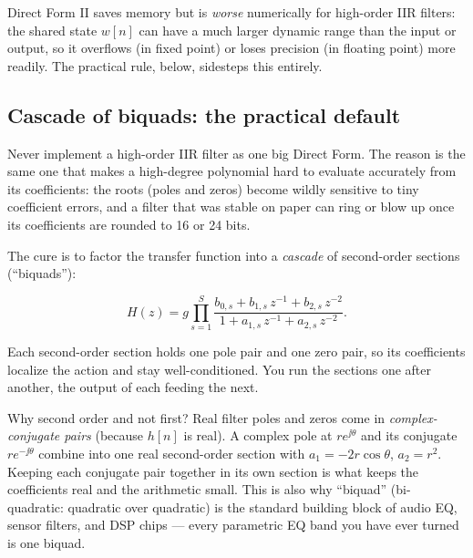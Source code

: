 \begin{trapbox}
Direct Form II saves memory but is \emph{worse} numerically for high-order IIR
filters: the shared state $w[n]$ can have a much larger dynamic range than the
input or output, so it overflows (in fixed point) or loses precision (in
floating point) more readily. The practical rule, below, sidesteps this entirely.
\end{trapbox}

\subsection{Cascade of biquads: the practical default}
\label{ch17:biquad}

Never implement a high-order IIR filter as one big Direct Form. The reason is
the same one that makes a high-degree polynomial hard to evaluate accurately from its
coefficients: the roots (poles and zeros) become wildly sensitive to tiny
coefficient errors, and a filter that was stable on paper can ring or blow up
once its coefficients are rounded to 16 or 24 bits.

The cure is to factor the transfer function into a \emph{cascade} of
second-order sections (``biquads''):

\begin{equation}
  H(z) = g \prod_{s=1}^{S} \frac{b_{0,s} + b_{1,s}\,z^{-1} + b_{2,s}\,z^{-2}}
                                 {1 + a_{1,s}\,z^{-1} + a_{2,s}\,z^{-2}}.
  \label{ch17:cascade}
\end{equation}

Each second-order section holds one pole pair and one zero pair, so its
coefficients localize the action and stay well-conditioned. You run the sections
one after another, the output of each feeding the next.

\begin{whybox}
Why second order and not first? Real filter poles and zeros come in
\emph{complex-conjugate pairs} (because $h[n]$ is real). A complex pole at
$re^{\jj\theta}$ and its conjugate $re^{-\jj\theta}$ combine into one real
second-order section with $a_1 = -2r\cos\theta$, $a_2 = r^2$. Keeping each
conjugate pair together in its own section is what keeps the coefficients real
and the arithmetic small. This is also why ``biquad'' (bi-quadratic: quadratic
over quadratic) is the standard building block of audio EQ, sensor filters, and DSP
chips --- every parametric EQ band you have ever turned is one biquad.
\end{whybox}

